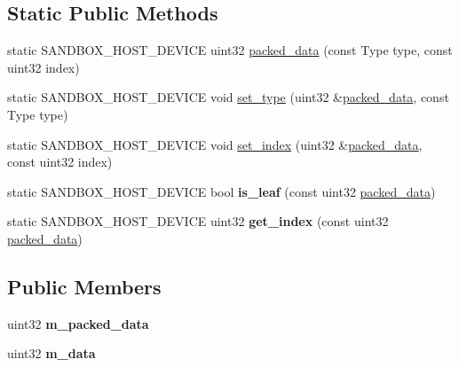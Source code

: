 \subsection*{Static Public Methods}
\begin{DoxyCompactItemize}
\item 
static S\+A\+N\+D\+B\+O\+X\+\_\+\+H\+O\+S\+T\+\_\+\+D\+E\+V\+I\+CE uint32 \hyperlink{structsandbox_1_1_bvh__node_3_01_compact__bvh__tag_01_4_abd56f185aab1ea010813bd24b383a667}{packed\+\_\+data} (const Type type, const uint32 index)
\item 
static S\+A\+N\+D\+B\+O\+X\+\_\+\+H\+O\+S\+T\+\_\+\+D\+E\+V\+I\+CE void \hyperlink{structsandbox_1_1_bvh__node_3_01_compact__bvh__tag_01_4_ae81939099d3fe8a4cbafbde56c148fa5}{set\+\_\+type} (uint32 \&\hyperlink{structsandbox_1_1_bvh__node_3_01_compact__bvh__tag_01_4_abd56f185aab1ea010813bd24b383a667}{packed\+\_\+data}, const Type type)
\item 
static S\+A\+N\+D\+B\+O\+X\+\_\+\+H\+O\+S\+T\+\_\+\+D\+E\+V\+I\+CE void \hyperlink{structsandbox_1_1_bvh__node_3_01_compact__bvh__tag_01_4_a52bfb193b48c41677ca454b7e63e0117}{set\+\_\+index} (uint32 \&\hyperlink{structsandbox_1_1_bvh__node_3_01_compact__bvh__tag_01_4_abd56f185aab1ea010813bd24b383a667}{packed\+\_\+data}, const uint32 index)
\item 
\mbox{\label{structsandbox_1_1_bvh__node_3_01_compact__bvh__tag_01_4_ad74089873b1f66257aadad9f8747e931}} 
static S\+A\+N\+D\+B\+O\+X\+\_\+\+H\+O\+S\+T\+\_\+\+D\+E\+V\+I\+CE bool {\bfseries is\+\_\+leaf} (const uint32 \hyperlink{structsandbox_1_1_bvh__node_3_01_compact__bvh__tag_01_4_abd56f185aab1ea010813bd24b383a667}{packed\+\_\+data})
\item 
\mbox{\label{structsandbox_1_1_bvh__node_3_01_compact__bvh__tag_01_4_afdef934caa69017c104aedd6dedbb5b1}} 
static S\+A\+N\+D\+B\+O\+X\+\_\+\+H\+O\+S\+T\+\_\+\+D\+E\+V\+I\+CE uint32 {\bfseries get\+\_\+index} (const uint32 \hyperlink{structsandbox_1_1_bvh__node_3_01_compact__bvh__tag_01_4_abd56f185aab1ea010813bd24b383a667}{packed\+\_\+data})
\end{DoxyCompactItemize}
\subsection*{Public Members}
\begin{DoxyCompactItemize}
\item 
\mbox{\label{structsandbox_1_1_bvh__node_3_01_compact__bvh__tag_01_4_ad781b792203805e6b09151a7335cf59e}} 
uint32 {\bfseries m\+\_\+packed\+\_\+data}
\item 
\mbox{\label{structsandbox_1_1_bvh__node_3_01_compact__bvh__tag_01_4_ae7b949a6066415fcd2a35d3dc67fb4c3}} 
uint32 {\bfseries m\+\_\+data}
\end{DoxyCompactItemize}
